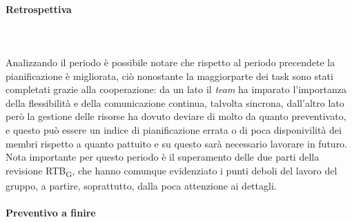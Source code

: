 \paragraph{Retrospettiva} \hspace{1cm} 
\\ \hspace{1cm} \\
Analizzando il periodo è possibile notare che rispetto al periodo precendete la pianificazione è migliorata, ciò nonostante la maggiorparte dei task sono stati completati grazie alla cooperazione: da un lato il \textit{team} ha imparato l'importanza della flessibilità e della comunicazione continua, talvolta sincrona, dall'altro lato però la gestione delle risorse ha dovuto deviare di molto da quanto preventivato, e questo può essere un indice di pianificazione errata o di poca disponivilità dei membri rispetto a quanto pattuito e su questo sarà necessario lavorare in futuro.
\\ Nota importante per questo periodo è il superamento delle due parti della revisione RTB\textsubscript{G}, che hanno comunque evidenziato i punti deboli del lavoro del gruppo, a partire, soprattutto,  dalla poca attenzione ai dettagli.

\paragraph{Preventivo a finire} \hspace{1cm}
\begin{table}[H]
\centering
{}
\caption{Preventivo a finire dopo la retrospettiva sul periodo V}
\end{table}


